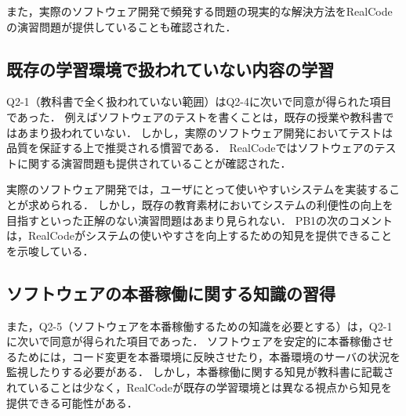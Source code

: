 
また，実際のソフトウェア開発で頻発する問題の現実的な解決方法をRealCodeの演習問題が提供していることも確認された．




\subsection*{既存の学習環境で扱われていない内容の学習}

Q2-1（教科書で全く扱われていない範囲）はQ2-4に次いで同意が得られた項目であった．
例えばソフトウェアのテストを書くことは，既存の授業や教科書ではあまり扱われていない．
しかし，実際のソフトウェア開発においてテストは品質を保証する上で推奨される慣習である．
RealCodeではソフトウェアのテストに関する演習問題も提供されていることが確認された．



実際のソフトウェア開発では，ユーザにとって使いやすいシステムを実装することが求められる．
しかし，既存の教育素材においてシステムの利便性の向上を目指すといった正解のない演習問題はあまり見られない．
PB1の次のコメントは，RealCodeがシステムの使いやすさを向上するための知見を提供できることを示唆している．





\subsection*{ソフトウェアの本番稼働に関する知識の習得}

また，Q2-5（ソフトウェアを本番稼働するための知識を必要とする）は，Q2-1に次いで同意が得られた項目であった．
ソフトウェアを安定的に本番稼働させるためには，コード変更を本番環境に反映させたり，本番環境のサーバの状況を監視したりする必要がある．
しかし，本番稼働に関する知見が教科書に記載されていることは少なく，RealCodeが既存の学習環境とは異なる視点から知見を提供できる可能性がある．




























